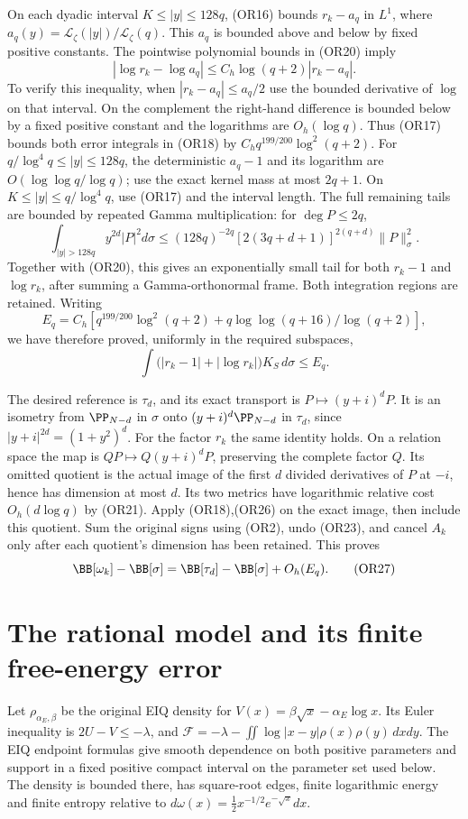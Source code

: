 On each dyadic interval \(K\leq |y|\leq128q\), (OR16) bounds
\(r_k-a_q\) in \(L^1\), where
\(a_q(y)=\mathcal L_\zeta(|y|)/\mathcal L_\zeta(q)\).
This \(a_q\) is bounded above and below by fixed positive constants.
The pointwise polynomial bounds in (OR20) imply
\[
 |\log r_k-\log a_q|\leq C_h\log(q+2)|r_k-a_q|.
 \tag{OR24}
\]
To verify this inequality, when \(|r_k-a_q|\leq a_q/2\) use the
bounded derivative of \(\log\) on that interval.  On the complement
the right-hand difference is bounded below by a fixed positive
constant and the logarithms are \(O_h(\log q)\).
Thus (OR17) bounds both error integrals in (OR18) by
\(C_hq^{199/200}\log^2(q+2)\).
For \(q/\log^4q\leq|y|\leq128q\), the deterministic \(a_q-1\)
and its logarithm are \(O(\log\log q/\log q)\); use the exact
kernel mass at most \(2q+1\).  On
\(K\leq|y|\leq q/\log^4q\), use (OR17) and the interval length.
The full remaining tails are bounded by repeated Gamma
multiplication: for \(\deg P\leq2q\),
\[
 \int_{|y|>128q} y^{2d}|P|^2d\sigma
 \leq (128q)^{-2q}[2(3q+d+1)]^{2(q+d)}\|P\|_\sigma^2 .
 \tag{OR25}
\]
Together with (OR20), this gives an exponentially small tail for
both \(r_k-1\) and \(\log r_k\), after summing a Gamma-orthonormal
frame.  Both integration regions are retained.
Writing
\[
 E_q=C_h\left[q^{199/200}\log^2(q+2)
       +q\log\log(q+16)/\log(q+2)\right],
\]
we have therefore proved, uniformly in the required subspaces,
\[
 \int\bigl(|r_k-1|+|\log r_k|\bigr)K_S\,d\sigma\leq E_q.
 \tag{OR26}
\]

The desired reference is \(\tau_d\), and its exact transport is
\(P\mapsto(y+i)^dP\).  It is an isometry from
\(\PP_{N-d}\) in \(\sigma\) onto
\((y+i)^d\PP_{N-d}\) in \(\tau_d\), since
\(|y+i|^{2d}=(1+y^2)^d\).
For the factor \(r_k\) the same identity holds.  On a relation
space the map is \(QP\mapsto Q(y+i)^dP\), preserving the complete
factor \(Q\).  Its omitted quotient is the actual image of
the first \(d\) divided derivatives of \(P\) at \(-i\), hence has
dimension at most \(d\).  Its two metrics have logarithmic
relative cost \(O_h(d\log q)\) by (OR21).
Apply (OR18),(OR26) on the exact image, then include this quotient.
Sum the original signs using (OR2), undo (OR23), and cancel \(A_k\)
only after each quotient's dimension has been retained.  This proves
\[
 \BB[\omega_k]-\BB[\sigma]
 =\BB[\tau_d]-\BB[\sigma]+O_h(E_q).                  \tag{OR27}
\]

\section{The rational model and its finite free-energy error}
Let \(\rho_{\alpha_E,\beta}\) be the original EIQ density for
\(V(x)=\beta\sqrt x-\alpha_E\log x\).  Its Euler inequality is
\(2U-V\leq-\lambda\), and
\(\mathcal F=-\lambda-\iint\log|x-y|\rho(x)\rho(y)\,dxdy\).
The EIQ endpoint formulas give smooth dependence on both positive
parameters and support in a fixed positive compact interval on
the parameter set used below.  The density is bounded there,
has square-root edges, finite logarithmic energy and finite
entropy relative to
\(d\omega(x)=\tfrac12x^{-1/2}e^{-\sqrt x}dx\).

